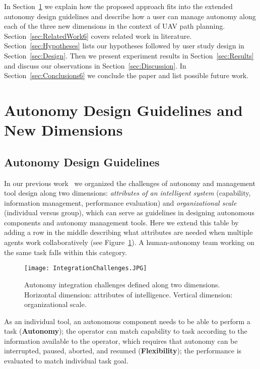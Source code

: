 In Section~\ref{sec:dimensions} we explain how the proposed approach fits into the extended autonomy design guidelines and describe how a user can manage autonomy along each of the three new dimensions in the context of UAV path planning. Section~\ref{sec:RelatedWork6} covers related work in literature. Section~\ref{sec:Hypotheses} lists our hypotheses followed by user study design in Section~\ref{sec:Design}. Then we present experiment results in Section~\ref{sec:Results} and discuss our observations in Section~\ref{sec:Discussion}. In Section~\ref{sec:Conclusions6} we conclude the paper and list possible future work.

\section{Autonomy Design Guidelines and New Dimensions}
\label{sec:dimensions}

\subsection{Autonomy Design Guidelines}

In our previous work~\cite{Lin2010Supporting} we organized the challenges of autonomy and management tool design along two dimensions: \textit{attributes of an intelligent system} (capability, information management, performance evaluation) and \textit{organizational scale} (individual versus group), which can serve as guidelines in designing autonomous components and autonomy management tools. Here we extend this table by adding a row in the middle describing what attributes are needed when multiple agents work collaboratively (see Figure~\ref{IChallenges}). A human-autonomy team working on the same task falls within this category. 

\begin{figure}
\centering
\texttt{[image: IntegrationChallenges.JPG]}
\caption{Autonomy integration challenges defined along two dimensions. Horizontal dimension: attributes of intelligence. Vertical dimension: organizational scale.}
\label{IChallenges}
\end{figure}

As an individual tool, an autonomous component needs to be able to perform a task (\textbf{Autonomy}); the operator can match capability to task according to the information available to the operator, which requires that autonomy can be interrupted, paused, aborted, and resumed (\textbf{Flexibility}); the performance is evaluated to match individual task goal. 

